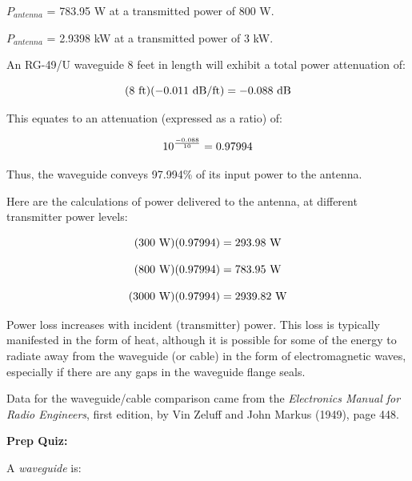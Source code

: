 \vskip 10pt

$P_{antenna}$ = 783.95 W at a transmitted power of 800 W.

\vskip 10pt

$P_{antenna}$ = 2.9398 kW at a transmitted power of 3 kW.







An RG-49/U waveguide 8 feet in length will exhibit a total power attenuation of:

$$(8 \hbox{ ft}) (-0.011 \hbox{ dB/ft}) = -0.088 \hbox{ dB}$$

This equates to an attenuation (expressed as a ratio) of:

$$10^{-0.088 \over 10} = 0.97994$$

Thus, the waveguide conveys 97.994\% of its input power to the antenna.

\vskip 10pt

Here are the calculations of power delivered to the antenna, at different transmitter power levels:

$$(300 \hbox{ W}) (0.97994) = 293.98 \hbox{ W}$$

$$(800 \hbox{ W}) (0.97994) = 783.95 \hbox{ W}$$

$$(3000 \hbox{ W}) (0.97994) = 2939.82 \hbox{ W}$$

\vskip 10pt

Power loss increases with incident (transmitter) power.  This loss is typically manifested in the form of heat, although it is possible for some of the energy to radiate away from the waveguide (or cable) in the form of electromagnetic waves, especially if there are any gaps in the waveguide flange seals.

\vskip 10pt

Data for the waveguide/cable comparison came from the {\it Electronics Manual for Radio Engineers}, first edition, by Vin Zeluff and John Markus (1949), page 448.

















\vfil \eject

\noindent
{\bf Prep Quiz:}

A {\it waveguide} is:


